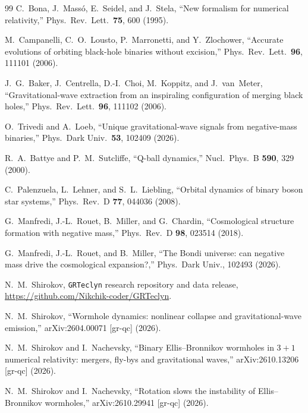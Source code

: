 \documentclass[twocolumn,floatfix,aps,prd,superscriptaddress,nofootinbib]{revtex4-2}
\begin{document}
\begin{thebibliography}{99}
C.~Bona, J.~Mass\'o, E.~Seidel, and J.~Stela,
\newblock ``New formalism for numerical relativity,''
\newblock Phys.\ Rev.\ Lett.\ \textbf{75}, 600 (1995).

M.~Campanelli, C.~O.~Lousto, P.~Marronetti, and Y.~Zlochower,
\newblock ``Accurate evolutions of orbiting black-hole binaries without excision,''
\newblock Phys.\ Rev.\ Lett.\ \textbf{96}, 111101 (2006).

J.~G.~Baker, J.~Centrella, D.-I.~Choi, M.~Koppitz, and J.~van~Meter,
\newblock ``Gravitational-wave extraction from an inspiraling configuration of merging black holes,''
\newblock Phys.\ Rev.\ Lett.\ \textbf{96}, 111102 (2006).

O.~Trivedi and A.~Loeb,
\newblock ``Unique gravitational-wave signals from negative-mass binaries,''
\newblock Phys.\ Dark Univ.\ \textbf{53}, 102409 (2026).

R.~A.~Battye and P.~M.~Sutcliffe,
\newblock ``Q-ball dynamics,''
\newblock Nucl.\ Phys.\ B \textbf{590}, 329 (2000).

C.~Palenzuela, L.~Lehner, and S.~L.~Liebling,
\newblock ``Orbital dynamics of binary boson star systems,''
\newblock Phys.\ Rev.\ D \textbf{77}, 044036 (2008).

G.~Manfredi, J.-L.~Rouet, B.~Miller, and G.~Chardin,
\newblock ``Cosmological structure formation with negative mass,''
\newblock Phys.\ Rev.\ D \textbf{98}, 023514 (2018).

G.~Manfredi, J.-L.~Rouet, and B.~Miller,
\newblock ``The Bondi universe: can negative mass drive the cosmological expansion?,''
\newblock Phys.\ Dark Univ., 102493 (2026).

N.~M.~Shirokov,
\newblock \texttt{GRTeclyn} research repository and data release,
\newblock \url{https://github.com/Nikchik-coder/GRTeclyn}.

N.~M.~Shirokov,
\newblock ``Wormhole dynamics: nonlinear collapse and gravitational-wave emission,''
\newblock arXiv:2604.00071 [gr-qc] (2026).

N.~M.~Shirokov and I.~Nachevsky,
\newblock ``Binary Ellis--Bronnikov wormholes in $3{+}1$ numerical relativity: mergers, fly-bys and gravitational waves,''
\newblock arXiv:2610.13206 [gr-qc] (2026).

N.~M.~Shirokov and I.~Nachevsky,
\newblock ``Rotation slows the instability of Ellis--Bronnikov wormholes,''
\newblock arXiv:2610.29941 [gr-qc] (2026).

\end{thebibliography}
\end{document}
